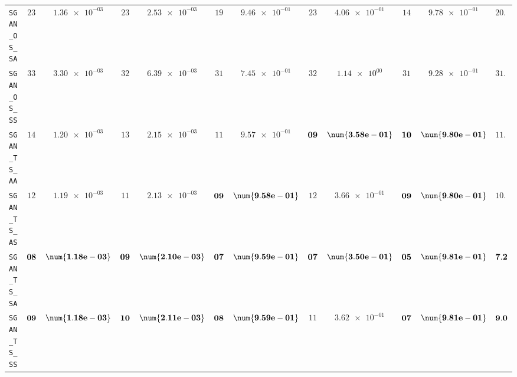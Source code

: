 \begin{xltabular}{\textwidth}{l||cC|cC|cC|cC|cC||c}
	\texttt{SGAN\_OS\_SA} & $ 23$ & $ \num{1.36e-03}$ & $ 23$ & $ \num{2.53e-03}$ & $ 19$ & $ \num{9.46e-01}$ & $ 23$ & $ \num{4.06e-01}$ & $ 14$ & $ \num{9.78e-01}$ & $ 20.4$  \\
	\texttt{SGAN\_OS\_SS} & $ 33$ & $ \num{3.30e-03}$ & $ 32$ & $ \num{6.39e-03}$ & $ 31$ & $ \num{7.45e-01}$ & $ 32$ & $ \num{1.14e+00}$ & $ 31$ & $ \num{9.28e-01}$ & $ 31.8$  \\
	\texttt{SGAN\_TS\_AA} & $ 14$ & $ \num{1.20e-03}$ & $ 13$ & $ \num{2.15e-03}$ & $ 11$ & $ \num{9.57e-01}$ & $\bf 09$ & $\bf \num{3.58e-01}$ & $\bf 10$ & $\bf \num{9.80e-01}$ & $ 11.4$  \\
	\texttt{SGAN\_TS\_AS} & $ 12$ & $ \num{1.19e-03}$ & $ 11$ & $ \num{2.13e-03}$ & $\bf 09$ & $\bf \num{9.58e-01}$ & $ 12$ & $ \num{3.66e-01}$ & $\bf 09$ & $\bf \num{9.80e-01}$ & $ 10.6$  \\
	\texttt{SGAN\_TS\_SA} & $\bf 08$ & $\bf \num{1.18e-03}$ & $\bf 09$ & $\bf \num{2.10e-03}$ & $\bf 07$ & $\bf \num{9.59e-01}$ & $\bf 07$ & $\bf \num{3.50e-01}$ & $\bf 05$ & $\bf \num{9.81e-01}$ & $\bf 7.2$  \\
	\texttt{SGAN\_TS\_SS} & $\bf 09$ & $\bf \num{1.18e-03}$ & $\bf 10$ & $\bf \num{2.11e-03}$ & $\bf 08$ & $\bf \num{9.59e-01}$ & $ 11$ & $ \num{3.62e-01}$ & $\bf 07$ & $\bf \num{9.81e-01}$ & $\bf 9.0$  \\ \hline

\end{xltabular}
